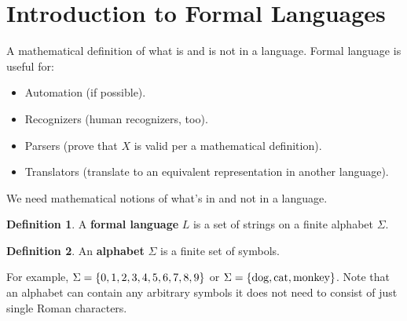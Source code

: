 \documentclass[]{article}
\DeclarePairedDelimiter{\set}{\lbrace}{\rbrace}
\theoremstyle{definition}
\newtheorem*{defn}{Definition}
\newcommand{\lecture}[1]{\marginpar{{\footnotesize $\leftarrow$ \underline{#1}}}}
\begin{document}
	\section{Introduction to Formal Languages}
		A mathematical definition of what is and is not in a language. Formal language is useful for:
		\begin{itemize}
			\item Automation (if possible).
			\item Recognizers (human recognizers, too).
			\item Parsers (prove that $X$ is valid per a mathematical definition).
			\item Translators (translate to an equivalent representation in another language).
		\end{itemize}

		\lecture{February 4, 2013}
		We need mathematical notions of what's in and not in a language.

		\begin{defn}
		A \textbf{formal language} $L$ is a set of strings on a finite alphabet $\Sigma$.
		\end{defn}

		\begin{defn}
			An \textbf{alphabet} $\Sigma$ is a finite set of symbols.
		\end{defn}
		For example, $\Sigma = \set{0, 1, 2, 3, 4, 5, 6, 7, 8, 9}$ or $\Sigma = \set{\text{dog}, \text{cat}, \text{monkey}}$. Note that an alphabet can contain any arbitrary symbols \textendash{} it does not need to consist of just single Roman characters.
\end{document}
